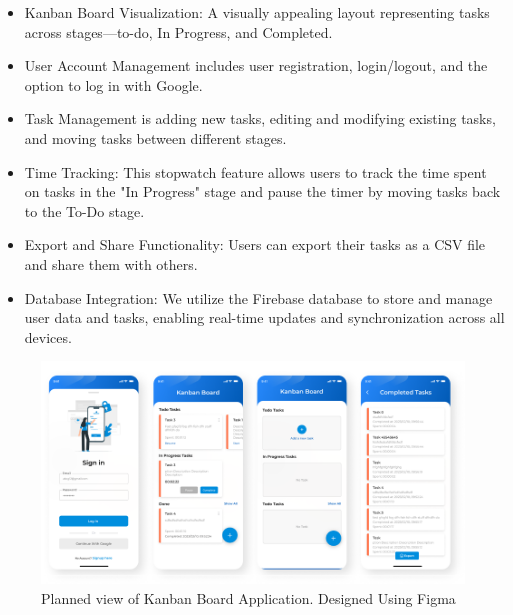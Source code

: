 \begin{itemize}
\item	Kanban Board Visualization: A visually appealing layout representing tasks across stages—to-do, In Progress, and Completed.
\item	User Account Management includes user registration, login/logout, and the option to log in with Google.  
\item  	Task Management is adding new tasks, editing and modifying existing tasks, and moving tasks between different stages.
\item 	Time Tracking: This stopwatch feature allows users to track the time spent on tasks in the "In Progress" stage and pause the timer by moving tasks back to the To-Do stage.
\item 	Export and Share Functionality: Users can export their tasks as a CSV file and share them with others.
\item   Database Integration: We utilize the Firebase database to store and manage user data and tasks, enabling real-time updates and synchronization across all devices.
\end{itemize}

\begin{figure}[htbp]
    \centering
    \includegraphics[scale = 0.85]{img/kanban_board.png}
    \caption{Planned view of Kanban Board Application. Designed Using Figma}
    \label{fig:kanban_board}
\end{figure}

